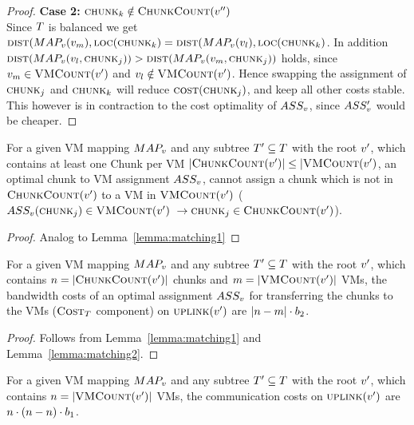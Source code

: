 \begin{proof}
\textbf{Case 2:} $\textsc{chunk}_k \notin \textsc{ChunkCount}(v'')$\\
Since $T$ is balanced we get $\textsc{dist}(MAP_v(v_m), 
\textsc{loc}(\textsc{chunk}_k)  = \textsc{dist}(MAP_v(v_l), 
\textsc{loc}(\textsc{chunk}_k)$. In addition $\textsc{dist}(MAP_v(v_l, 
\textsc{chunk}_j)) > \textsc{dist}(MAP_v(v_m, 
\textsc{chunk}_j)) $ holds, since $v_m \in \textsc{VMCount}(v')$ and 
$v_l \notin 
\textsc{VMCount}(v')$. Hence swapping the assignment of $\textsc{chunk}_j$ and 
$\textsc{chunk}_k$ will reduce $\textsc{cost}(\textsc{chunk}_j)$, and keep all other costs 
stable. This however is in contraction to the cost optimality of 
$ASS_v$, since $ASS_v'$ would be cheaper.
\end{proof}

\begin{lemma}
\label{lemma:matching2}
For a given VM mapping $MAP_v$ and any subtree $T' \subseteq 
T$ with the root $v'$, which contains at least one Chunk per 
VM $|\textsc{ChunkCount}(v')| \leq |\textsc{VMCount}(v')$, an 
optimal chunk to VM assignment $ASS_v$, cannot assign a chunk 
which is not in $\textsc{ChunkCount}(v')$ to a VM in 
$\textsc{VMCount}(v')$ ($ASS_v(\textsc{chunk}_j) \in 
\textsc{VMCount}(v')~ \rightarrow \textsc{chunk}_j \in 
\textsc{ChunkCount}(v')$).
\end{lemma}

\begin{proof}
 Analog to Lemma~\ref{lemma:matching1}
\end{proof}

\begin{corollary}
For a given VM mapping $MAP_v$ and any subtree $T' \subseteq 
T$ with the root $v'$, which contains $n = 
|\textsc{ChunkCount}(v')|$ chunks and $m = |\textsc{VMCount}(v')|$ 
VMs, the bandwidth costs of an optimal assignment $ASS_v$ for 
transferring the chunks to the VMs ($\textsc{Cost}_T$ 
component) on $\textsc{uplink}(v')$ are $|n 
- m| \cdot b_2$.
\end{corollary}

\begin{proof}
 Follows from Lemma~\ref{lemma:matching1} and 
Lemma~\ref{lemma:matching2}. 
\end{proof}

\begin{lemma}
 For a given VM mapping $MAP_v$ and any subtree $T' \subseteq 
T$ with the root $v'$, which contains $n 
= |\textsc{VMCount}(v')|$ VMs, the communication costs on 
$\textsc{uplink}(v')$ are $n \cdot (n - n) 
\cdot 
b_1$.
\end{lemma}

